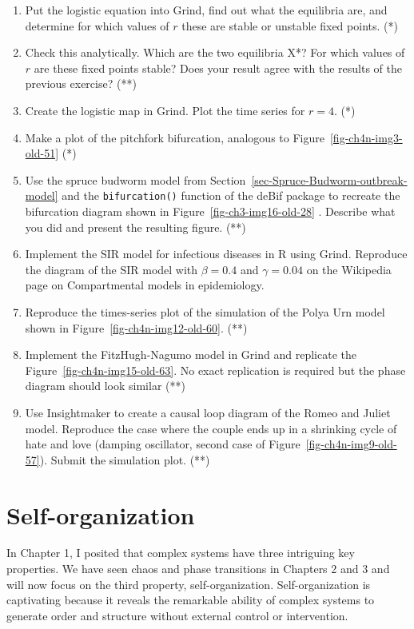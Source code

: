 \documentclass[
  a4paper,
  DIV=11,
  numbers=noendperiod]{scrreprt}
\begin{document}
\begin{enumerate}
\def\labelenumi{\arabic{enumi})}
\item
  Put the logistic equation into Grind, find out what the equilibria
  are, and determine for which values of \(r\) these are stable or
  unstable fixed points. (*)
\item
  Check this analytically. Which are the two equilibria X*? For which
  values of \(r\) are these fixed points stable? Does your result agree
  with the results of the previous exercise? (**)
\item
  Create the logistic map in Grind. Plot the time series for \(r = 4\).
  (*)
\item
  Make a plot of the pitchfork bifurcation, analogous to
  Figure~\ref{fig-ch4n-img3-old-51} (*)
\item
  Use the spruce budworm model from
  Section~\ref{sec-Spruce-Budworm-outbreak-model} and the
  \texttt{bifurcation()} function of the deBif package to recreate the
  bifurcation diagram shown in Figure~\ref{fig-ch3-img16-old-28} .
  Describe what you did and present the resulting figure. (**)
\item
  Implement the SIR model for infectious diseases in R using Grind.
  Reproduce the diagram of the SIR model with \(\beta = 0.4\) and
  \(\gamma = 0.04\) on the Wikipedia page on Compartmental models in
  epidemiology.
\item
  Reproduce the times-series plot of the simulation of the Polya Urn
  model shown in Figure~\ref{fig-ch4n-img12-old-60}. (**)
\item
  Implement the FitzHugh-Nagumo model in Grind and replicate the
  Figure~\ref{fig-ch4n-img15-old-63}. No exact replication is required
  but the phase diagram should look similar (**)
\item
  Use Insightmaker to create a causal loop diagram of the Romeo and
  Juliet model. Reproduce the case where the couple ends up in a
  shrinking cycle of hate and love (damping oscillator, second case of
  Figure~\ref{fig-ch4n-img9-old-57}). Submit the simulation plot. (**)
\end{enumerate}


\hypertarget{sec-ch5n}{%
\chapter{Self-organization}\label{sec-ch5n}}

In Chapter 1, I posited that complex systems have three intriguing key
properties. We have seen chaos and phase transitions in Chapters 2 and 3
and will now focus on the third property, self-organization.
Self-organization is captivating because it reveals the remarkable
ability of complex systems to generate order and structure without
external control or intervention.
\end{document}
